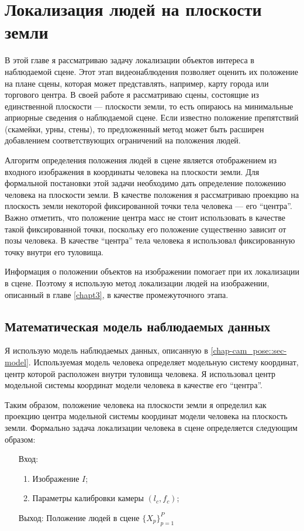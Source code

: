 \chapter{Локализация людей на плоскости земли} \label{chapt4}

В этой главе я рассматриваю задачу локализации объектов интереса в наблюдаемой сцене. Этот этап видеонаблюдения позволяет оценить их положение на плане сцены, которая может представлять, например, карту города или торгового центра. В своей работе я рассматриваю сцены, состоящие из единственной плоскости --- плоскости земли, то есть опираюсь на минимальные априорные сведения о наблюдаемой сцене. Если известно положение препятствий (скамейки, урны, стены), то предложенный метод может быть расширен добавлением соответствующих ограничений на положения людей.

Алгоритм определения положения людей в сцене является отображением из входного изображения в координаты человека на плоскости земли. Для формальной постановки этой задачи необходимо дать определение положению человека на плоскости земли. В качестве положения я рассматриваю проекцию на плоскость земли некоторой фиксированной точки тела человека --- его ``центра''. Важно отметить, что положение центра масс не стоит использовать в качестве такой фиксированной точки, поскольку его положение существенно зависит от позы человека. В качестве ``центра'' тела человека я использовал фиксированную точку внутри его туловища.

Информация о положении объектов на изображении помогает при их локализации в сцене. Поэтому я использую метод локализации людей на изображении, описанный в главе \ref{chapt3}, в качестве промежуточного этапа.

\section{Математическая модель наблюдаемых данных} \label{chapt-per_pose::sec-model}

Я использую модель наблюдаемых данных, описанную в \ref{chap-cam_pose::sec-model}. Используемая модель человека \cite{pishchulin15arxiv} определяет модельную систему координат, центр которой расположен внутри туловища человека. Я использовал центр модельной системы координат модели человека в качестве его ``центра''.

Таким образом, положение человека на плоскости земли я определил как проекцию центра модельной системы координат модели человека на плоскость земли. Формально задача локализации человека в сцене определяется следующим образом:
\begin{itemize}
	\item[Вход:] 
	\begin{enumerate}
		\item Изображение $I$;
		\item Параметры калибровки камеры $(l_c, f_c)$;
	\end{enumerate}
	\item[Выход:] Положение людей в сцене $\{X_p\}_{p=1}^P$
\end{itemize}

